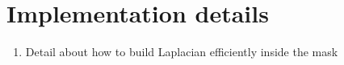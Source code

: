 \chapter{Implementation details}\label{appendix:implement}

\begin{enumerate}
\item Detail about how to build Laplacian efficiently inside the mask
\end{enumerate}

